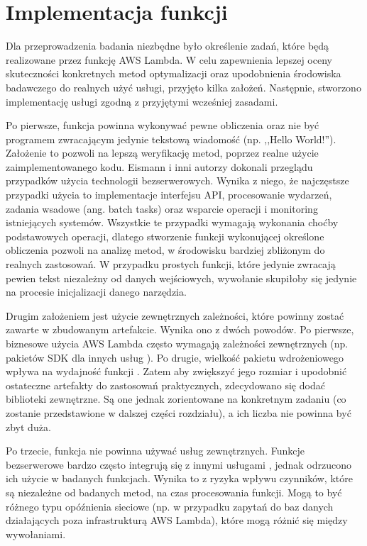 \section{Implementacja funkcji}\label{chapter:implementacja_funkcji}

Dla przeprowadzenia badania niezbędne było określenie zadań, które będą realizowane przez funkcję AWS Lambda.
W celu zapewnienia lepszej oceny skuteczności konkretnych metod optymalizacji oraz upodobnienia środowiska badawczego do realnych użyć usługi, przyjęto kilka założeń.
Następnie, stworzono implementację usługi zgodną z przyjętymi wcześniej zasadami.

Po pierwsze, funkcja powinna wykonywać pewne obliczenia oraz nie być programem zwracającym jedynie tekstową wiadomość (np. ,,Hello World!''). 
Założenie to pozwoli na lepszą weryfikację metod, poprzez realne użycie zaimplementowanego kodu.
Eismann i inni autorzy \cite{eismann2021reviewserverlessusecases} dokonali przeglądu przypadków użycia technologii bezserwerowych.
Wynika z niego, że najczęstsze przypadki użycia to implementacje interfejsu API, procesowanie wydarzeń, zadania wsadowe (ang. batch tasks) oraz wsparcie operacji i monitoring istniejących systemów.
Wszystkie te przypadki wymagają wykonania choćby podstawowych operacji, dlatego stworzenie funkcji wykonującej określone obliczenia pozwoli na analizę metod, w środowisku bardziej zbliżonym do realnych zastosowań.
W przypadku prostych funkcji, które jedynie zwracają pewien tekst niezależny od danych wejściowych, wywołanie skupiłoby się jedynie na procesie inicjalizacji danego narzędzia.

Drugim założeniem jest użycie zewnętrznych zależności, które powinny zostać zawarte w zbudowanym artefakcie.
Wynika ono z dwóch powodów. Po pierwsze, biznesowe użycia AWS Lambda często wymagają zależności zewnętrznych (np. pakietów SDK dla innych usług \cite{eismann2021reviewserverlessusecases}).
Po drugie, wielkość pakietu wdrożeniowego wpływa na wydajność funkcji \cite{8116416}\cite{9095731}.
Zatem aby zwiększyć jego rozmiar i upodobnić ostateczne artefakty do zastosowań praktycznych, zdecydowano się dodać biblioteki zewnętrzne.
Są one jednak zorientowane na konkretnym zadaniu (co zostanie przedstawione w dalszej części rozdziału), a ich liczba nie powinna być zbyt duża.

Po trzecie, funkcja nie powinna używać usług zewnętrznych.
Funkcje bezserwerowe bardzo często integrują się z innymi usługami \cite{eismann2021reviewserverlessusecases}, jednak odrzucono ich użycie w badanych funkcjach.
Wynika to z ryzyka wpływu czynników, które są niezależne od badanych metod, na czas procesowania funkcji.
Mogą to być różnego typu opóźnienia sieciowe (np. w przypadku zapytań do baz danych działających poza infrastrukturą AWS Lambda), które mogą różnić się między wywołaniami.

